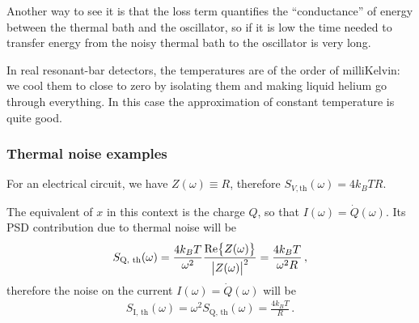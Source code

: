 \documentclass[main.tex]{subfiles}
\begin{document}
Another way to see it is that the loss term quantifies the ``conductance'' of energy between the thermal bath and the oscillator, so if it is low the time needed to transfer energy from the noisy thermal bath to the oscillator is very long. 

In real resonant-bar detectors, the temperatures are of the order of milliKelvin: we cool them to close to zero by isolating them and making liquid helium go through everything. 
In this case the approximation of constant temperature is quite good.

\subsubsection{Thermal noise examples}

For an electrical circuit, we have \(Z(\omega ) \equiv R\), therefore \(S_{V, \text{th}} (\omega ) = 4 k_B T R\). 

The equivalent of \(x\) in this context is the charge \(Q\), so that \(I(\omega ) = \dot{Q}(\omega )\). Its PSD contribution due to thermal noise will be 
%
\begin{align}
S _{\text{Q, th}} (\omega ) = \frac{4 k_B T}{\omega^2} \frac{\Re{Z(\omega )}}{\abs{Z(\omega )}^2} = \frac{4 k_B T}{\omega^2 R}
\,,
\end{align}
%
therefore the noise on the current \(I(\omega ) = \dot{Q} (\omega )\) will be 
%
\begin{align}
S _{\text{I, th}} (\omega ) = \omega^2 S _{\text{Q, th}} (\omega ) = \frac{4 k_B T}{R}
\,.
\end{align}





\end{document}
